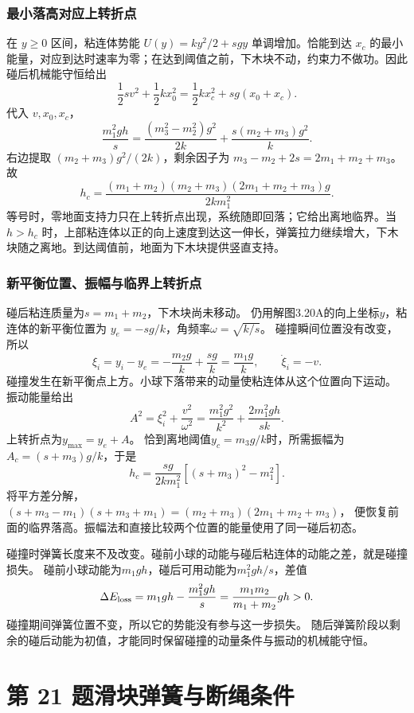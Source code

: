 \documentclass[UTF8,fontset=fandol,a4paper,11pt]{ctexart}
\newcommand{\tagline}[1]{\noindent{\small\color{muted}#1}\par}
\begin{document}
\subsubsection*{最小落高对应上转折点}
在 $y\geq0$ 区间，粘连体势能
$U(y)=ky^2/2+sgy$ 单调增加。恰能到达 $x_c$ 的最小能量，对应到达时速率为零；在达到阈值之前，下木块不动，约束力不做功。因此碰后机械能守恒给出
\[
\frac12sv^2+\frac12kx_0^2
=\frac12kx_c^2+sg(x_0+x_c).
\]
代入 $v,x_0,x_c$，
\[
\frac{m_1^2gh}{s}
=\frac{(m_3^2-m_2^2)g^2}{2k}
+\frac{s(m_2+m_3)g^2}{k}.
\]
右边提取 $(m_2+m_3)g^2/(2k)$，剩余因子为
$m_3-m_2+2s=2m_1+m_2+m_3$。故
\[
\boxed{h_c=
\frac{(m_1+m_2)(m_2+m_3)(2m_1+m_2+m_3)g}
{2km_1^2}}.
\]
等号时，零地面支持力只在上转折点出现，系统随即回落；它给出离地临界。当 $h>h_c$ 时，上部粘连体以正的向上速度到达这一伸长，弹簧拉力继续增大，下木块随之离地。到达阈值前，地面为下木块提供竖直支持。
\subsubsection*{新平衡位置、振幅与临界上转折点}
碰后粘连质量为$s=m_1+m_2$，下木块尚未移动。
仍用解图3.20A的向上坐标$y$，粘连体的新平衡位置为
$y_e=-sg/k$，角频率$\omega=\sqrt{k/s}$。
碰撞瞬间位置没有改变，所以
\[
\xi_i=y_i-y_e=-\frac{m_2g}{k}+\frac{sg}{k}
=\frac{m_1g}{k},\qquad \dot\xi_i=-v.
\]
碰撞发生在新平衡点上方。小球下落带来的动量使粘连体从这个位置向下运动。
振动能量给出
\[
A^2=\xi_i^2+\frac{v^2}{\omega^2}
=\frac{m_1^2g^2}{k^2}+\frac{2m_1^2gh}{sk}.
\]
上转折点为$y_{\max}=y_e+A$。
恰到离地阈值$y_c=m_3g/k$时，所需振幅为
$A_c=(s+m_3)g/k$，于是
\[
h_c=\frac{sg}{2km_1^2}[(s+m_3)^2-m_1^2].
\]
将平方差分解，
$(s+m_3-m_1)(s+m_3+m_1)
=(m_2+m_3)(2m_1+m_2+m_3)$，
便恢复前面的临界落高。振幅法和直接比较两个位置的能量使用了同一碰后初态。

碰撞时弹簧长度来不及改变。碰前小球的动能与碰后粘连体的动能之差，就是碰撞损失。
碰前小球动能为$m_1gh$，碰后可用动能为$m_1^2gh/s$，差值
\[
\Delta E_{\rm loss}=m_1gh-\frac{m_1^2gh}{s}
=\frac{m_1m_2}{m_1+m_2}gh>0.
\]
碰撞期间弹簧位置不变，所以它的势能没有参与这一步损失。
随后弹簧阶段以剩余的碰后动能为初值，才能同时保留碰撞的动量条件与振动的机械能守恒。




\section*{第 21 题\quad 滑块弹簧与断绳条件}

\tagline{M-03-21}
\end{document}
